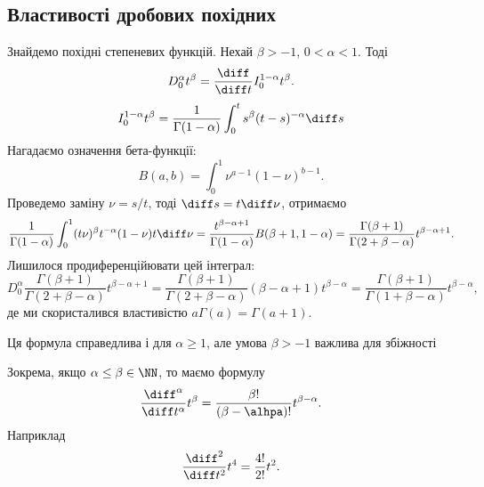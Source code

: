 \subsection{Властивості дробових похідних}

\begin{example}
    Знайдемо похідні степеневих функцій. Нехай $\beta > -1$, $0 < \alpha < 1$. Тоді
    \begin{equation}
        D_0^\alpha t^\beta = \frac{\diff}{\diff t} I_0^{1-\alpha} t^\beta.
    \end{equation}
    \begin{equation}
        I_0^{1-\alpha} t^\beta = \frac{1}{\Gamma(1 - \alpha)} \int_0^t s^\beta (t- s)^{-\alpha} \diff s
    \end{equation}
    Нагадаємо означення бета-функції:
    \begin{equation}
        B(a,b) = \int_0^1 \nu^{a-1}(1-\nu)^{b-1}.
    \end{equation}
    Проведемо заміну $\nu = s / t$, тоді $\diff s = t \diff \nu$, отримаємо
    \begin{equation}
        \frac{1}{\Gamma(1-\alpha)} \int_0^1 (t \nu)^\beta t^{-\alpha} (1 - \nu) t \diff \nu = \frac{t^{\beta - \alpha + 1}}{\Gamma(1 - \alpha)} B(\beta + 1, 1 - \alpha) = \frac{\Gamma(\beta + 1)}{\Gamma(2 + \beta - \alpha)} t^{\beta - \alpha + 1}.
    \end{equation}
    Лишилося продиференційювати цей інтеграл:
    \begin{equation}
        D_0^\alpha \frac{\Gamma(\beta + 1)}{\Gamma(2 + \beta - \alpha)} t^{\beta - \alpha + 1} = \frac{\Gamma(\beta + 1)}{\Gamma(2 + \beta - \alpha)} (\beta - \alpha + 1) t^{\beta - \alpha} = \frac{\Gamma(\beta + 1)}{\Gamma(1 + \beta - \alpha)} t^{\beta - \alpha},
    \end{equation}
    де ми скористалився властивістю $a \Gamma(a) = \Gamma(a + 1)$.
\end{example}
\begin{remark}
    Ця формула справедлива і для $\alpha \ge 1$, але умова $\beta > -1$ важлива для збіжності 
\end{remark}

\begin{example}
    Зокрема, якщо $\alpha \le \beta \in \NN$, то маємо формулу
    \begin{equation}
        \frac{\diff^\alpha}{\diff t^\alpha} t^\beta = \frac{\beta!}{(\beta - \alhpa)!} t^{\beta - \alpha}.
    \end{equation}
    Наприклад
    \begin{equation}
        \frac{\diff^2}{\diff t^2} t^4 = \frac{4!}{2!} t^2.
    \end{equation}
\end{example}

